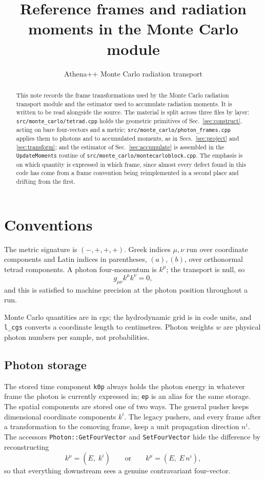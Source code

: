 \documentclass[11pt]{article}
\title{Reference frames and radiation moments in the Monte Carlo module}
\author{Athena++ Monte Carlo radiation transport}
\date{}
\begin{document}
\maketitle

\begin{abstract}
This note records the frame transformations used by the Monte Carlo radiation transport
module and the estimator used to accumulate radiation moments. It is written to be read
alongside the source. The material is split across three files by layer:
\texttt{src/monte\_carlo/tetrad.cpp} holds the geometric primitives of
Sec.~\ref{sec:construct}, acting on bare four-vectors and a metric;
\texttt{src/monte\_carlo/photon\_frames.cpp} applies them to photons and to accumulated
moments, as in Secs.~\ref{sec:project} and \ref{sec:transform}; and the estimator of
Sec.~\ref{sec:accumulate} is assembled in the \texttt{UpdateMoments} routine of
\texttt{src/monte\_carlo/montecarloblock.cpp}. The emphasis is on which quantity is
expressed in which frame, since almost every defect found in this code has come from a
frame convention being reimplemented in a second place and drifting from the first.
\end{abstract}

\section{Conventions}

The metric signature is $(-,+,+,+)$. Greek indices $\mu,\nu$ run over coordinate
components and Latin indices in parentheses, $(a),(b)$, over orthonormal tetrad
components. A photon four-momentum is $k^\mu$; the transport is null, so
\begin{equation}
  g_{\mu\nu} k^\mu k^\nu = 0 ,
  \label{eq:null}
\end{equation}
and this is satisfied to machine precision at the photon position throughout a run.

Monte Carlo quantities are in cgs; the hydrodynamic grid is in code units, and
\texttt{l\_cgs} converts a coordinate length to centimetres. Photon weights $w$ are
physical photon numbers per sample, not probabilities.

\subsection{Photon storage}

The stored time component \texttt{k0p} always holds the photon energy in whatever frame
the photon is currently expressed in; \texttt{ep} is an alias for the same storage. The
spatial components are stored one of two ways. The general pusher keeps dimensional
coordinate components $k^i$. The legacy pushers, and every frame after a transformation
to the comoving frame, keep a unit propagation direction $n^i$. The accessors
\texttt{Photon::GetFourVector} and \texttt{SetFourVector} hide the difference by
reconstructing
\begin{equation}
  k^\mu = \left( E,\; k^i \right)
  \qquad\text{or}\qquad
  k^\mu = \left( E,\; E\, n^i \right) ,
\end{equation}
so that everything downstream sees a genuine contravariant four-vector.
\end{document}
